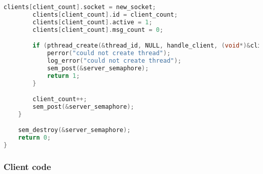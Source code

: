 \documentclass{article}
\begin{document}
\begin{lstlisting}[language=C, caption= server code - Socket Programming Code]
        clients[client_count].socket = new_socket;
        clients[client_count].id = client_count;
        clients[client_count].active = 1;
        clients[client_count].msg_count = 0;

        if (pthread_create(&thread_id, NULL, handle_client, (void*)&clients[client_count]) < 0) {
            perror("could not create thread");
            log_error("could not create thread");
            sem_post(&server_semaphore);
            return 1;
        }

        client_count++;
        sem_post(&server_semaphore);
    }

    sem_destroy(&server_semaphore);
    return 0;
}
\end{lstlisting}

\subsubsection*{Client code}
\end{document}
